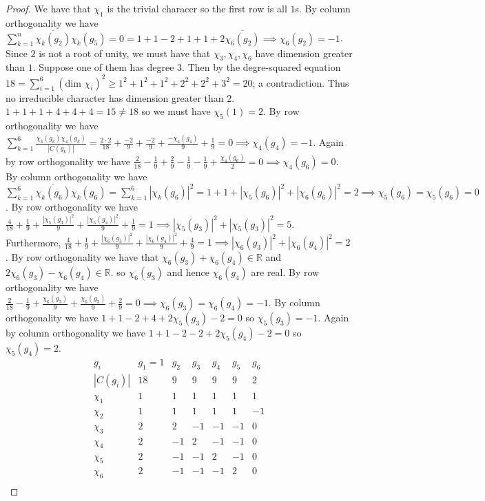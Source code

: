 \documentclass{article}
\begin{document}
\begin{proof}
We have that $\chi_1$ is the trivial characer so the first row is all $1$s. By column orthogonality we have $\sum_{k=1}^n\overline{\chi_k(g_2)}\chi_k(g_5)=0=1+1-2+1+1+2\overline{\chi_6(g_2)}\implies \chi_6(g_2)=-1$. Since $2$ is not a root of unity, we must have that $\chi_3,\chi_4,\chi_6$ have dimension greater than $1$. Suppose one of them has degree $3$. Then by the degre-squared equation $18=\sum_{i=1}^6(\text{dim }\chi_i)^2\geq 1^2+1^2+1^2+2^2+2^2+3^2=20$; a contradiction. Thus no irreducible character has dimension greater than $2$. $1+1+1+4+4+4=15\neq 18$ so we must have $\chi_5(1)=2$. By row orthogonality we have $\sum_{k=1}^6\frac{\overline{\chi_3(g_k)}\chi_4(g_k)}{|C(g_k)|}=\frac{2\cdot 2}{18}+\frac{-2}{9}+\frac{-2}{9}+\frac{-\chi_4(g_4)}{9}+\frac{1}{9}=0\implies \chi_4(g_4)=-1$. Again by row orthogonality we have $\frac{2}{18}-\frac{1}{9}+\frac{2}{9}-\frac{1}{9}-\frac{1}{9}+\frac{\chi_4(g_6)}{2}=0\implies \chi_4(g_6)=0$. By column orthogonality we have $\sum_{k=1}^6\overline{\chi_k(g_6)}\chi_k(g_6)=\sum_{k=1}^6|\chi_k(g_6)|^2=1+1+|\chi_5(g_6)|^2+|\chi_6(g_6)|^2=2\implies \chi_5(g_6)=\chi_5(g_6)=0$. By row orthogonality we have $\frac{4}{18}+\frac{1}{9}+\frac{|\chi_5(g_3)|^2}{9}+\frac{|\chi_5(g_4)|^2}{9}+\frac{1}{9}=1\implies |\chi_5(g_3)|^2+|\chi_5(g_3)|^2=5$. Furthermore, $\frac{4}{18}+\frac{1}{9}+\frac{|\chi_6(g_3)|^2}{9}+\frac{|\chi_6(g_4)|^2}{9}+\frac{4}{9}=1\implies |\chi_6(g_3)|^2+|\chi_6(g_4)|^2=2$. By row orthogonality we have that $\chi_6(g_3)+\chi_6(g_4)\in\mathbb{R}$ and $2\chi_6(g_3)-\chi_6(g_4)\in\mathbb{R}$. so $\chi_6(g_3)$ and hence $\chi_6(g_4)$ are real. By row orthogonality we have $\frac{2}{18}-\frac{1}{9}+\frac{\chi_6(g_3)}{9}+\frac{\chi_6(g_3)}{9}+\frac{2}{9}=0\implies \chi_6(g_3)=\chi_6(g_4)=-1$. By column orthogonality we have $1+1-2+4+2\chi_5(g_3)-2=0$ so $\chi_5(g_3)=-1$. Again by column orthogonality we have $1+1-2-2+2\chi_5(g_4)-2=0$ so $\chi_5(g_4)=2$.
\[
    \begin{array}{c|cccccc}
    g_i & g_1 = 1 & g_2 & g_3 & g_4 & g_5 & g_6 \\
    |C(g_i)| & 18 & 9 & 9 & 9 & 9 & 2 \\
    \hline
    \chi_1 & 1 & 1  & 1  & 1  & 1  & 1  \\
    \chi_2 & 1 & 1 & 1 & 1 & 1 & -1 \\
    \chi_3 & 2 & 2 & -1 & -1 & -1 & 0 \\
    \chi_4 & 2 & -1 & 2 & -1 & -1 & 0 \\
    \chi_5 & 2 & -1 & -1 & 2 & -1 & 0 \\
    \chi_6 & 2  &  -1 &  -1&  -1& 2 & 0 \\
    \end{array}
    \]
\end{proof}
\end{document}
